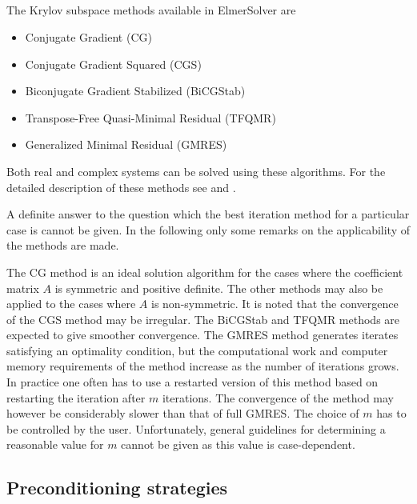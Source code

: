 \begin{versiona}
\subsection{}

The Krylov subspace methods available in ElmerSolver are
\begin{itemize}
\item Conjugate Gradient (CG)
\item Conjugate Gradient Squared (CGS) 
\item Biconjugate Gradient Stabilized (BiCGStab)
\item Transpose-Free Quasi-Minimal Residual (TFQMR)
\item Generalized Minimal Residual (GMRES)
\end{itemize}
Both real and complex systems can be solved using these algorithms. 
For the detailed description of these methods see \cite{Barrett93} 
and \cite{Freund93}.

A definite answer to the question which the best iteration method for a particular
case is cannot be given. 
In the following only some remarks on the applicability of the 
methods are made.
   
The CG method is an ideal solution algorithm for the cases where the coefficient
matrix $A$ is symmetric and positive definite. The other methods may 
also be applied to the cases where $A$ is non-symmetric. It is noted that 
the convergence of the CGS method may be irregular. %
The BiCGStab and TFQMR methods are expected to give smoother convergence.
The GMRES method generates iterates satisfying an optimality condition, 
but the computational work and computer memory requirements of the method 
increase as the number of iterations grows. 
In practice one often has to use a restarted version of this method based on restarting 
the iteration after $m$ iterations. 
The convergence of the method may however be considerably slower than that of full GMRES.
The choice of $m$ has to be controlled by the user. 
Unfortunately, general guidelines for determining a reasonable value for
$m$ cannot be given as this value is case-dependent.  


\subsection{Preconditioning strategies}


\end{versiona}
